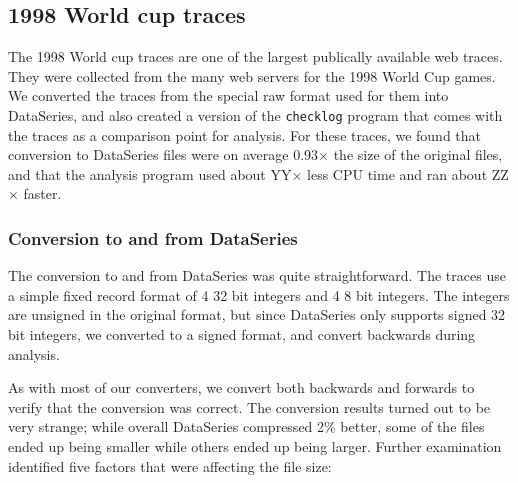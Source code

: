 \subsection{1998 World cup traces}\label{sec:world-cup-1998}

The 1998 World cup traces\cite{ita-wcweb98} are one of the largest
publically available web traces.  They were collected from the many
web servers for the 1998 World Cup games.  We converted the traces
from the special raw format used for them into DataSeries, and also
created a version of the {\tt checklog} program that comes with the
traces as a comparison point for analysis.  For these traces, we found
that conversion to DataSeries files were on average 0.93$\times$ the
size of the original files, and that the analysis program used about
YY$\times$ less CPU time and ran about ZZ$\times$ faster.

\subsubsection{Conversion to and from DataSeries}

The conversion to and from DataSeries was quite straightforward.  The
traces use a simple fixed record format of 4 32 bit integers and 4 8
bit integers.  The integers are unsigned in the original format, but
since DataSeries only supports signed 32 bit integers, we converted
to a signed format, and convert backwards during analysis.  

As with most of our converters, we convert both backwards and forwards
to verify that the conversion was correct.  The conversion results
turned out to be very strange; while overall DataSeries compressed 2\%
better, some of the files ended up being smaller while others ended up
being larger.  Further examination identified five factors that were 
affecting the file size:


